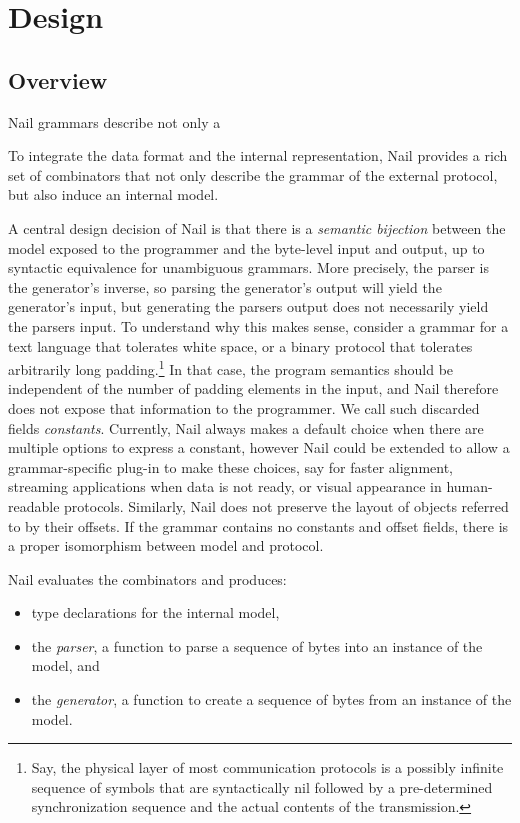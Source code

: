 \section{Design}
\label{s:design}

\subsection{Overview}
 
Nail grammars describe not only a 

To integrate the data format and the internal representation, Nail
provides a rich set of combinators that not
only describe the grammar of the external protocol, but also induce an internal
model.

A central design decision of Nail is that there is a \emph{semantic bijection} between
the model exposed to the programmer and the byte-level input and output, up to
syntactic equivalence for unambiguous grammars. More precisely, the parser is
the generator's inverse, so parsing the generator's output will yield the
generator's input, but generating the parsers output does not necessarily yield
the parsers input. To understand why this makes sense, consider a grammar for a
text language that tolerates white space, or a binary protocol that tolerates
arbitrarily long padding.\footnote{Say, the physical layer of most communication
  protocols is a possibly infinite sequence of symbols that are syntactically
  nil followed by a pre-determined synchronization sequence and the actual
  contents of the transmission.} In that case, the program semantics should be
independent of the number of padding elements in the input, and Nail therefore
does not expose that information to the programmer. We call such discarded
fields \emph{constants}. Currently, Nail always makes a default choice when
there are multiple options to express a constant, however Nail could be extended
to allow a grammar-specific plug-in to make these choices, say for faster
alignment, streaming applications when data is not ready, or visual appearance in
human-readable protocols. Similarly, Nail does not preserve the layout of
objects referred to by their offsets. If the grammar contains no constants and
offset fields, there is a proper isomorphism between model and protocol.


Nail evaluates the combinators and produces:

\begin{itemize}
\item type declarations for the internal model,
\item the \textit{parser}, a function to parse a sequence of bytes into an
instance of the model, and
\item the \textit{generator}, a function to create a
sequence of bytes from an instance of the model.
\end{itemize}

